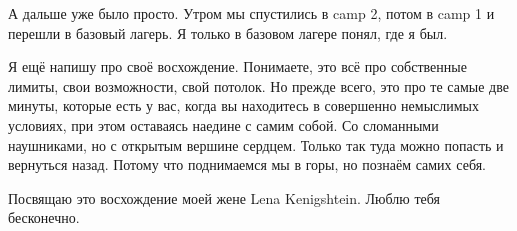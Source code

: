 А дальше уже было просто. Утром мы спустились в camp 2, потом в camp 1 и
перешли в базовый лагерь. Я только в базовом лагере понял, где я был. 

Я ещё напишу про своё восхождение. Понимаете, это всё про собственные лимиты,
свои возможности, свой потолок. Но прежде всего, это про те самые две минуты,
которые есть у вас, когда вы находитесь в совершенно немыслимых условиях, при
этом оставаясь наедине с самим собой. Со сломанными наушниками, но с открытым
вершине сердцем. Только так туда можно попасть и вернуться назад. Потому что
поднимаемся мы в горы, но познаём самих себя. 

Посвящаю это восхождение моей жене Lena Kenigshtein. Люблю тебя бесконечно.

